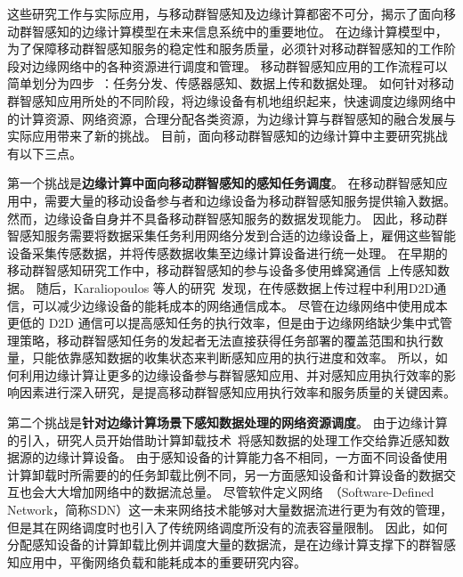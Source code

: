 这些研究工作与实际应用，与移动群智感知及边缘计算都密不可分，揭示了面向移动群智感知的边缘计算模型在未来信息系统中的重要地位。
在边缘计算模型中，为了保障移动群智感知服务的稳定性和服务质量，必须针对移动群智感知的工作阶段对边缘网络中的各种资源进行调度和管理。
移动群智感知应用的工作流程可以简单划分为四步~\cite{zh_cn:shi}：任务分发、传感器感知、数据上传和数据处理。
如何针对移动群智感知应用所处的不同阶段，将边缘设备有机地组织起来，快速调度边缘网络中的计算资源、网络资源，合理分配各类资源，为边缘计算与群智感知的融合发展与实际应用带来了新的挑战。
目前，面向移动群智感知的边缘计算中主要研究挑战有以下三点。

第一个挑战是\textbf{边缘计算中面向移动群智感知的感知任务调度}。
在移动群智感知应用中，需要大量的移动设备参与者和边缘设备为移动群智感知服务提供输入数据。
然而，边缘设备自身并不具备移动群智感知服务的数据发现能力。
因此，移动群智感知服务需要将数据采集任务利用网络分发到合适的边缘设备上，雇佣这些智能设备采集传感数据，并将传感数据收集至边缘计算设备进行统一处理。
在早期的移动群智感知研究工作中，移动群智感知的参与设备多使用蜂窝通信~\cite{DBLP:conf/globecom/ZhangJLLC16,DBLP:conf/icdcs/XiaoWHHH16}上传感知数据。
随后，Karaliopoulos 等人的研究~\cite{DBLP:conf/infocom/KaraliopoulosTK15}发现，在传感数据上传过程中利用D2D通信，可以减少边缘设备的能耗成本的网络通信成本。
尽管在边缘网络中使用成本更低的 D2D 通信可以提高感知任务的执行效率，但是由于边缘网络缺少集中式管理策略，移动群智感知任务的发起者无法直接获得任务部署的覆盖范围和执行数量，只能依靠感知数据的收集状态来判断感知应用的执行进度和效率。
所以，如何利用边缘计算让更多的边缘设备参与群智感知应用、并对感知应用执行效率的影响因素进行深入研究，是提高移动群智感知应用执行效率和服务质量的关键因素。


第二个挑战是\textbf{针对边缘计算场景下感知数据处理的网络资源调度}。
由于边缘计算的引入，研究人员开始借助计算卸载技术~\cite{DBLP:journals/network/MaZZWP13}将感知数据的处理工作交给靠近感知数据源的边缘计算设备。
由于感知设备的计算能力各不相同，一方面不同设备使用计算卸载时所需要的的任务卸载比例不同，另一方面感知设备和计算设备的数据交互也会大大增加网络中的数据流总量。
尽管软件定义网络~（Software-Defined Network，简称SDN）这一未来网络技术能够对大量数据流进行更为有效的管理，但是其在网络调度时也引入了传统网络调度所没有的流表容量限制。
因此，如何分配感知设备的计算卸载比例并调度大量的数据流，是在边缘计算支撑下的群智感知应用中，平衡网络负载和能耗成本的重要研究内容。

